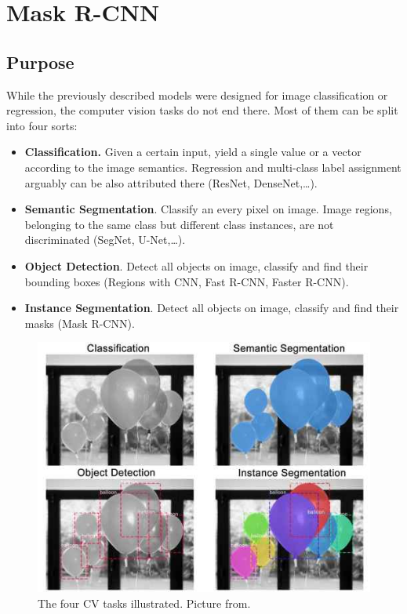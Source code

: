 \documentclass[thesis=B,english]{FITthesis}[2019/12/23]
\begin{document}
\section{Mask R-CNN}

\subsection{Purpose}

While the previously described models were designed for image classification or regression, the computer vision tasks do not end there. Most of them can be split into four sorts:
\begin{itemize}
	\item \textbf{Classification.} Given a certain input, yield a single value or a vector according to the image semantics. Regression and multi-class label assignment arguably can be also attributed there (ResNet, DenseNet,\dots).
	\item \textbf{Semantic Segmentation}. Classify an every pixel on image. Image regions, belonging to the same class but different class instances, are not discriminated (SegNet, U-Net,\dots).
	\item \textbf{Object Detection}. Detect all objects on image, classify and find their bounding boxes (Regions with CNN, Fast R-CNN, Faster R-CNN).
	\item \textbf{Instance Segmentation}. Detect all objects on image, classify and find their masks (Mask R-CNN).
\end{itemize}

\begin{figure}[ht]
	\centering
	\includegraphics[scale=0.75]{images/segmentation.jpeg}
	\caption{The four CV tasks illustrated. Picture from\cite{splash_of_color}.}
\end{figure}
\end{document}
